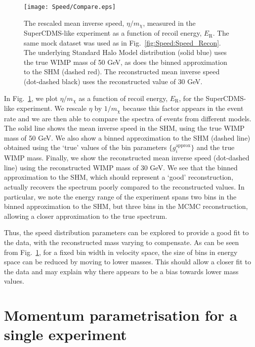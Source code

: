  \begin{figure}[t]
\centering
  \texttt{[image: Speed/Compare.eps]}
\caption[Reconstructed mean inverse speed for the SuperCDMS-like experiment]{The rescaled mean inverse speed, \(\eta/m_\chi\), measured in the SuperCDMS-like experiment as a function of recoil energy, \(E_\textrm{R}\). The same mock dataset was used as in Fig.\ \ref{fig:Speed:Speed_Recon}. The underlying Standard Halo Model distribution (solid blue) uses the true WIMP mass of 50 GeV, as does the binned approximation to the SHM (dashed red). The reconstructed mean inverse speed (dot-dashed black) uses the reconstructed value of 30 GeV.}
  \label{fig:Speed:Compare}
\end{figure}


In Fig.\ \ref{fig:Speed:Compare}, we plot \(\eta/m_\chi\) as a function of recoil energy, \(E_\textrm{R}\), for the SuperCDMS-like experiment. We rescale \(\eta\) by \(1/m_\chi\) because this factor appears in the event rate and we are then able to compare the spectra of events from different models. The solid line shows the mean inverse speed in the SHM, using the true WIMP mass of 50 GeV. We also show a binned approximation to the SHM (dashed line) obtained using the `true' values of the bin parameters \(\{g_i^\textrm{approx}\}\) and the true WIMP mass. Finally, we show the reconstructed mean inverse speed (dot-dashed line) using the reconstructed WIMP mass of 30 GeV. We see that the binned approximation to the SHM, which should represent a `good' reconstruction, actually recovers the spectrum poorly compared to the reconstructed values. In particular, we note the energy range of the experiment spans two bins in the binned approximation to the SHM, but three bins in the MCMC reconstruction, allowing a closer approximation to the true spectrum.

Thus, the speed distribution parameters can be explored to provide a good fit to the data, with the reconstructed mass varying to compensate. As can be seen from Fig.\ \ref{fig:Speed:Compare}, for a fixed bin width in velocity space, the size of bins in energy space can be reduced by moving to lower masses. This should allow a closer fit to the data and may explain why there appears to be a bias towards lower mass values.


\section{Momentum parametrisation for a single experiment}
\label{sec:Speed:MomentumMethod1}

